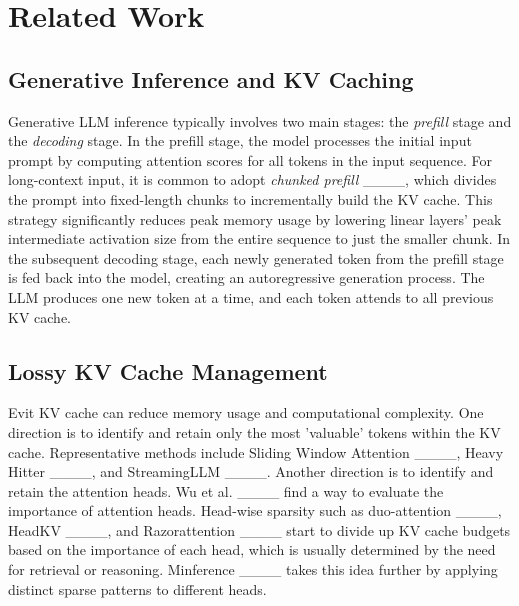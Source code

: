 \section{Related Work}


\subsection{Generative Inference and KV Caching}

Generative LLM inference typically involves two main stages: the  \emph{prefill} stage and the  \emph{decoding} stage. In the prefill stage, the model processes the initial input prompt by computing attention scores for all tokens in the input sequence. 
For long-context input, it is common to adopt \emph{chunked prefill} ____, which divides the prompt into fixed-length chunks to incrementally build the KV cache. This strategy significantly reduces peak memory usage by lowering linear layers' peak intermediate activation size from the entire sequence to just the smaller chunk. 
In the subsequent decoding stage, each newly generated token from the prefill stage is fed back into the model, creating an autoregressive generation process. The LLM produces one new token at a time, and each token attends to all previous KV cache. %


\subsection{Lossy KV Cache Management} Evit KV cache can reduce memory usage and computational complexity. One direction is to identify and retain only the most 'valuable' tokens within the KV cache. Representative methods include Sliding Window Attention ____, Heavy Hitter ____, and StreamingLLM ____. Another direction is to identify and retain the attention heads. Wu et al. ____ find a way to evaluate the importance of attention heads. Head-wise sparsity such as duo-attention ____, HeadKV ____, and Razorattention ____ start to divide up KV cache budgets based on the importance of each head, which is usually determined by the need for retrieval or reasoning.  Minference ____ takes this idea further by applying distinct sparse patterns to different heads.

